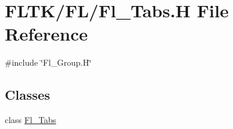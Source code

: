 \hypertarget{_fl___tabs_8_h}{}\section{F\+L\+T\+K/\+F\+L/\+Fl\+\_\+\+Tabs.H File Reference}
\label{_fl___tabs_8_h}
{\ttfamily \#include \char`\"{}Fl\+\_\+\+Group.\+H\char`\"{}}\newline
\subsection*{Classes}
\begin{DoxyCompactItemize}
\item 
class \hyperlink{class_fl___tabs}{Fl\+\_\+\+Tabs}
\end{DoxyCompactItemize}
